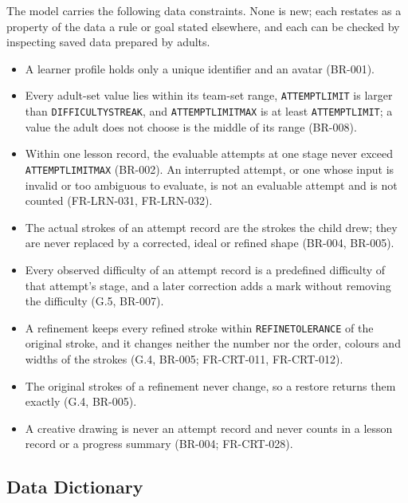 \documentclass[12pt]{article}
\renewcommand{\_}{\textunderscore\allowbreak}%
\begin{document}
The model carries the following data constraints. None is new; each restates as
a property of the data a rule or goal stated elsewhere, and each can be checked
by inspecting saved data prepared by adults.
\begin{itemize}
  \item A learner profile holds only a unique identifier and an avatar
  (BR-001).
  \item Every adult-set value lies within its team-set range,
  \texttt{ATTEMPT\_LIMIT} is larger than \texttt{DIFFICULTY\_STREAK}, and
  \texttt{ATTEMPT\_LIMIT\_MAX} is at least \texttt{ATTEMPT\_LIMIT}; a value the
  adult does not choose is the middle of its range (BR-008).
  \item Within one lesson record, the evaluable attempts at one stage never
  exceed \texttt{ATTEMPT\_LIMIT\_MAX} (BR-002). An interrupted attempt, or one
  whose input is invalid or too ambiguous to evaluate, is not an evaluable
  attempt and is not counted (FR-LRN-031, FR-LRN-032).
  \item The actual strokes of an attempt record are the strokes the child drew;
  they are never replaced by a corrected, ideal or refined shape (BR-004,
  BR-005).
  \item Every observed difficulty of an attempt record is a predefined
  difficulty of that attempt's stage, and a later correction adds a mark without
  removing the difficulty (G.5, BR-007).
  \item A refinement keeps every refined stroke within
  \texttt{REFINE\_TOLERANCE} of the original stroke, and it changes neither the
  number nor the order, colours and widths of the strokes (G.4, BR-005;
  FR-CRT-011, FR-CRT-012).
  \item The original strokes of a refinement never change, so a restore returns
  them exactly (G.4, BR-005).
  \item A creative drawing is never an attempt record and never counts in a
  lesson record or a progress summary (BR-004; FR-CRT-028).
\end{itemize}

\subsection{Data Dictionary}
\label{sec:data-dictionary}
\end{document}
